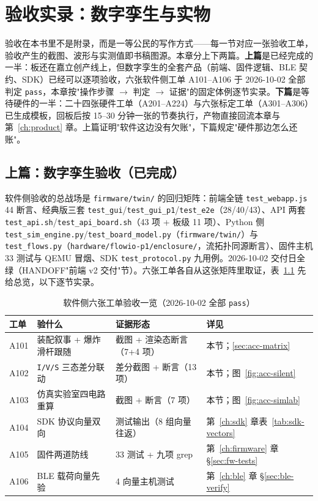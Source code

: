 \chapter{验收实录：数字孪生与实物}
\label{ch:acceptance}

验收在本书里不是附录，而是一等公民的写作方式——每一节对应一张验收工单，验收产生的截图、波形与实测值即书稿图源。本章分上下两篇。\textbf{上篇}是已经完成的一半：板还在嘉立创产线上，但数字孪生的全套产品（前端、固件逻辑、BLE 契约、SDK）已经可以逐项验收，六张软件侧工单 A101--A106 于 2026-10-02 全部判定 \texttt{pass}，本章按"操作步骤 $\to$ 判定 $\to$ 证据"的固定体例逐节实录。\textbf{下篇}是等待硬件的一半：二十四张硬件工单（A201--A224）与六张标定工单（A301--A306）已生成模板，回板后按 15--30 分钟一张的节奏执行，产物直接回流本章与第~\ref{ch:product} 章。上篇证明"软件这边没有欠账"，下篇规定"硬件那边怎么还账"。

\section{上篇：数字孪生验收（已完成）}
\label{sec:acc-sw}

软件侧验收的总战场是 \texttt{firmware/twin/} 的回归矩阵：前端全链 \texttt{test\_webapp.js} 44 断言、经典版三套 \texttt{test\_gui}/\texttt{test\_gui\_p1}/\texttt{test\_e2e}（28/40/43）、API 两套 \texttt{test\_api.sh}/\texttt{test\_api\_board.sh}（43 项 + 板级 11 项）、Python 侧 \texttt{test\_sim\_engine.py}/\texttt{test\_board\_model.py}（\texttt{firmware/twin/}）与 \texttt{test\_flows.py}（\texttt{hardware/flowio-p1/enclosure/}，流拓扑同源断言）、固件主机 33 测试与 QEMU 冒烟、SDK \texttt{test\_protocol.py} 九用例。2026-10-02 交付日全绿（HANDOFF"前端 v2 交付"节）。六张工单各自从这张矩阵里取证，表~\ref{tab:acc-sw-overview} 先给总览，以下逐节实录。

\begin{table}[htbp]
  \centering
  \caption{软件侧六张工单验收一览（2026-10-02 全部 \texttt{pass}）}
  \label{tab:acc-sw-overview}
  \begin{tabular}{@{}lp{4.1cm}p{3.6cm}l@{}}
    \toprule
    工单 & 验什么 & 证据形态 & 详见 \\
    \midrule
    A101 & 装配叙事 + 爆炸滑杆跟随 & 截图 + 渲染态断言（7+4 项） & 本节；\ref{sec:acc-matrix} \\
    A102 & \texttt{I/V/S} 三态差分联动 & 差分截图 + 断言（13 项） & 本节；图~\ref{fig:acc-silent} \\
    A103 & 仿真实验室四电路重算 & 截图 + 断言（7 项） & 本节；图~\ref{fig:acc-simlab} \\
    A104 & SDK 协议向量双向 & 测试输出（8 组向量往返） & 第~\ref{ch:sdk} 章表~\ref{tab:sdk-vectors} \\
    A105 & 固件两道防线 & 33 测试 + 九项 grep & 第~\ref{ch:firmware} 章 \S\ref{sec:fw-tests} \\
    A106 & BLE 载荷向量先验 & 4 向量主机测试 & 第~\ref{ch:ble} 章 \S\ref{sec:ble-verify} \\
    \bottomrule
  \end{tabular}
\end{table}


